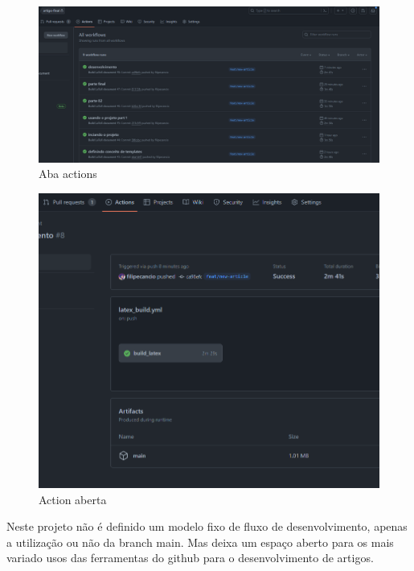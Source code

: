 \begin{figure}[ht]
	\centering
	\includegraphics[width=.5\textwidth]{./images/image10.png}
	\caption{Aba actions}
	\label{fig:image10}
\end{figure}


\begin{figure}[ht]
	\centering
	\includegraphics[width=.5\textwidth]{./images/image11.png}
	\caption{Action aberta}
	\label{fig:image11}
\end{figure}

Neste projeto não é definido um modelo fixo de fluxo de desenvolvimento, apenas a utilização ou não da branch main. Mas deixa um espaço aberto para os mais variado usos das ferramentas do github para o desenvolvimento de artigos.